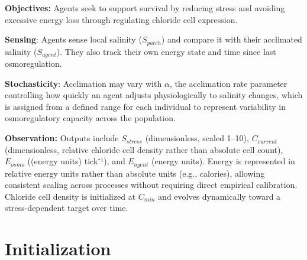 \documentclass[
]{book}
\begin{document}
\textbf{Objectives:} Agents seek to support survival by reducing stress and
avoiding excessive energy loss through regulating chloride cell
expression.

\textbf{Sensing}: Agents sense local salinity (\(S_{patch}\)) and compare it
with their acclimated salinity (\(S_{agent}\)). They also track their own
energy state and time since last osmoregulation.

\textbf{Stochasticity}: Acclimation may vary with \(\alpha\), the acclimation
rate parameter controlling how quickly an agent adjusts physiologically
to salinity changes, which is assigned from a defined range for each
individual to represent variability in osmoregulatory capacity across
the population.

\textbf{Observation:} Outputs include \(S_{stress}\) (dimensionless, scaled
1--10), \(C_{current}\) (dimensionless, relative chloride cell density
rather than absolute cell count), \(E_{osmo}\) ((energy units) tick⁻¹),
and \(E_{agent}\) (energy units). Energy is represented in relative energy
units rather than absolute units (e.g., calories), allowing consistent
scaling across processes without requiring direct empirical calibration.
Chloride cell density is initialized at \(C_{min}\) and evolves
dynamically toward a stress-dependent target over time.

\section{Initialization}\label{initialization-2}
\end{document}
